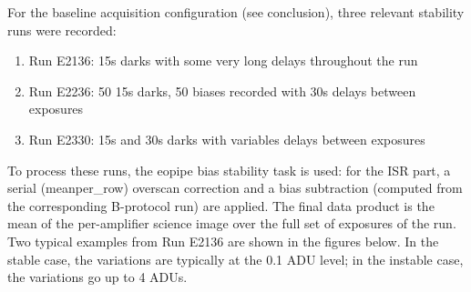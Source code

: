 For the baseline acquisition configuration (see conclusion), three
relevant stability runs were recorded:

\begin{enumerate}
\tightlist
\item
  Run E2136: 15s darks with some very long delays throughout the run
\item
  Run E2236: 50 15s darks, 50 biases recorded with 30s delays between
  exposures
\item
  Run E2330: 15s and 30s darks with variables delays between exposures
\end{enumerate}

To process these runs, the eo\label{pipe}{pipe} bias
stability task is used: for the ISR part, a serial
(\textquotesingle mean\label{per_row}{per\_row}\textquotesingle)
overscan correction and a bias subtraction (computed from the
corresponding B-protocol run) are applied. The final data product is the
mean of the per-amplifier science image over the full set of exposures
of the run. Two typical examples from Run E2136 are shown in the figures
below. In the stable case, the variations are typically at the 0.1 ADU
level; in the instable case, the variations go up to 4 ADUs.

